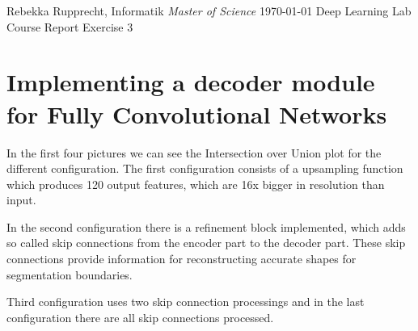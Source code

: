 \documentclass[
fontsize=12pt,
paper=a4,
parskip=false
]{article}
\begin{document}
	\noindent\makebox[\linewidth]{\rule{\textwidth}{0.4pt}}
	Rebekka Rupprecht, Informatik \textit{Master of Science} \hfill \today \newline
	Deep Learning Lab Course \newline
	Report Exercise 3 \newline
	\noindent\makebox[\linewidth]{\rule{\textwidth}{0.4pt}}
	\vspace{5pt}

\section*{Implementing a decoder module for Fully Convolutional Networks}
In the first four pictures we can see the Intersection over Union plot for the different configuration. The first configuration consists of a upsampling function which produces 120 output features, which are 16x bigger in resolution than input. 

In the second configuration there is a refinement block  implemented, which adds so called skip connections from the encoder part to the decoder part. These skip connections provide information for reconstructing accurate shapes for segmentation boundaries. 

Third configuration uses two skip connection processings and in the last configuration there are all skip connections processed. 
\end{document}
